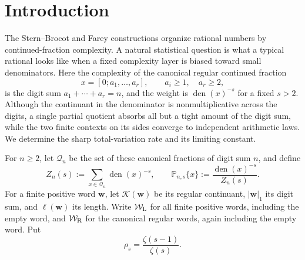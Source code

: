 \section{Introduction}\label{sec:introduction}

The Stern--Brocot and Farey constructions organize rational numbers by
continued-fraction complexity.  A natural statistical question is what a
typical rational looks like when a fixed complexity layer is biased toward
small denominators.  Here the complexity of the canonical regular continued
fraction
\[
 x=[0;a_1,\ldots,a_r],\qquad a_i\ge1,\quad a_r\ge2,
\]
is the digit sum \(a_1+\cdots+a_r=n\), and the weight is
\(\operatorname{den}(x)^{-s}\) for a fixed \(s>2\).  Although the continuant
in the denominator is nonmultiplicative across the digits, a single partial
quotient absorbs all but a tight amount of the digit sum, while the two
finite contexts on its sides converge to independent arithmetic laws.  We
determine the sharp total-variation rate and its limiting constant.

For \(n\ge2\), let \(\mathcal Q_n\) be the set of these canonical fractions
of digit sum \(n\), and define
\begin{equation}
 Z_n(s):=\sum_{x\in\mathcal Q_n}\operatorname{den}(x)^{-s},
 \qquad
 \mathbb P_{n,s}\{x\}:=\frac{\operatorname{den}(x)^{-s}}{Z_n(s)}.
 \label{eq:brocot-probability}
\end{equation}
For a finite positive word \(\mathbf w\), let \(\mathcal K(\mathbf w)\) be
its regular continuant, \(|\mathbf w|_1\) its digit sum, and
\(\ell(\mathbf w)\) its length.  Write \(\mathcal W_{\rm L}\) for all
finite positive words, including the empty word, and
\(\mathcal W_{\rm R}\) for the canonical regular words, again including the
empty word.  Put
\[
 \rho_s=\frac{\zeta(s-1)}{\zeta(s)}.
\]

